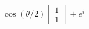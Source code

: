 \documentclass[preview]{standalone}
\begin{document}
\begin{align*}
\cos(\theta/2) \begin{bmatrix} 1 \\ 1\end{bmatrix} + e^{i}
\end{align*}
\end{document}
